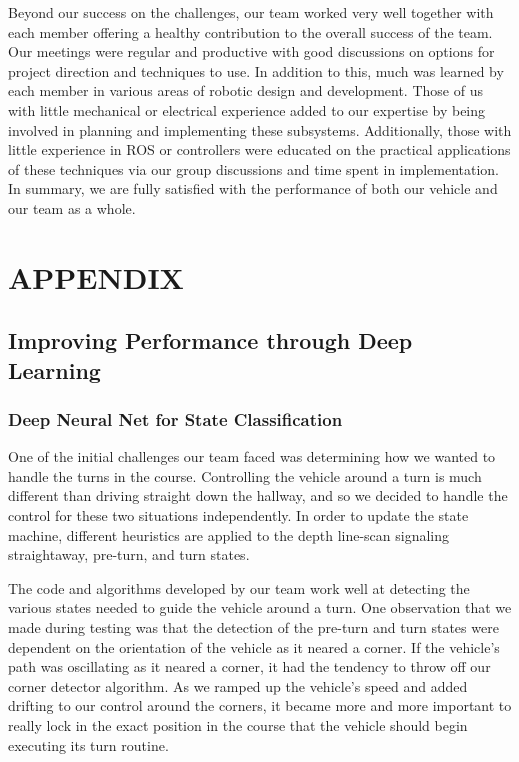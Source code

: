 \documentclass[letterpaper, 10 pt, conference]{ieeeconf}  %
\begin{document}
Beyond our success on the challenges, our team worked very well together with each member offering a healthy contribution to the overall success of the team. Our meetings were regular and productive with good discussions on options for project direction and techniques to use. In addition to this, much was learned by each member in various areas of robotic design and development. Those of us with little mechanical or electrical experience added to our expertise by being involved in planning and implementing these subsystems. Additionally, those with little experience in ROS or controllers were educated on the practical applications of these techniques via our group discussions and time spent in implementation. In summary, we are fully satisfied with the performance of both our vehicle and our team as a whole.








\section*{APPENDIX}

\subsection{Improving Performance through Deep Learning}
\subsubsection*{Deep Neural Net for State Classification}
One of the initial challenges our team faced was determining how we wanted to handle the turns in the course. Controlling the vehicle around a turn is much different than driving straight down the hallway, and so we decided to handle the control for these two situations independently. In order to update the state machine, different heuristics are applied to the depth line-scan signaling straightaway, pre-turn, and turn states. 

The code and algorithms developed by our team work well at detecting the various states needed to guide the vehicle around a turn. One observation that we made during testing was that the detection of the pre-turn and turn states were dependent on the orientation of the vehicle as it neared a corner. If the vehicle's path was oscillating as it neared a corner, it had the tendency to throw off our corner detector algorithm. As we ramped up the vehicle's speed and added drifting to our control around the corners, it became more and more important to really lock in the exact position in the course that the vehicle should begin executing its turn routine.
\end{document}
